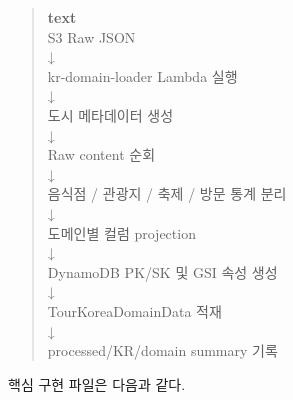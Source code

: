 \documentclass[12pt,a4paper]{article}
\newcommand{\DocNeedspace}[1]{\par\ifdim\dimexpr\pagegoal-\pagetotal\relax<#1\newpage\fi}
\begin{document}
\DocNeedspace{7\baselineskip}
\begin{quote}
\begin{scriptsize}
\ttfamily
\RaggedRight
\setlength{\parskip}{1pt}
\textcolor{LovvGreen}{\textbf{text}}\\[0.2em]
S3 Raw JSON\\
↓\\
kr-\allowbreak{}domain-\allowbreak{}loader Lambda {\normalfont 실행}\\
↓\\
{\normalfont 도시} {\normalfont 메타데이터} {\normalfont 생성}\\
↓\\
Raw content {\normalfont 순회}\\
↓\\
{\normalfont 음식점} /\allowbreak{} {\normalfont 관광지} /\allowbreak{} {\normalfont 축제} /\allowbreak{} {\normalfont 방문} {\normalfont 통계} {\normalfont 분리}\\
↓\\
{\normalfont 도메인별} {\normalfont 컬럼} projection\\
↓\\
Dynamo\allowbreak{}DB PK/\allowbreak{}SK {\normalfont 및} GSI {\normalfont 속성} {\normalfont 생성}\\
↓\\
Tour\allowbreak{}Korea\allowbreak{}Domain\allowbreak{}Data {\normalfont 적재}\\
↓\\
processed/\allowbreak{}KR/\allowbreak{}domain summary {\normalfont 기록}\\
\end{scriptsize}
\end{quote}


\DocNeedspace{3\baselineskip}
핵심 구현 파일은 다음과 같다.
\end{document}
